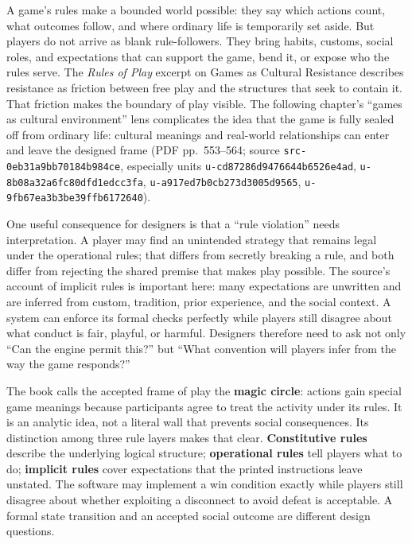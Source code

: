 \hypertarget{06-engine-ii-ch046-when-players-push-against-the-frame}{}

A game's rules make a bounded world possible: they say which actions count, what outcomes follow, and where ordinary life is temporarily set aside. But players do not arrive as blank rule-followers. They bring habits, customs, social roles, and expectations that can support the game, bend it, or expose who the rules serve. The \emph{Rules of Play} excerpt on Games as Cultural Resistance describes resistance as friction between free play and the structures that seek to contain it. That friction makes the boundary of play visible. The following chapter's ``games as cultural environment'' lens complicates the idea that the game is fully sealed off from ordinary life: cultural meanings and real-world relationships can enter and leave the designed frame (PDF pp.~553--564; source \texttt{src-0eb31a9bb70184b984ce}, especially units \texttt{u-cd87286d9476644b6526e4ad}, \texttt{u-8b08a32a6fc80dfd1edcc3fa}, \texttt{u-a917ed7b0cb273d3005d9565}, \texttt{u-9fb67ea3b3be39ffb6172640}).

One useful consequence for designers is that a ``rule violation'' needs interpretation. A player may find an unintended strategy that remains legal under the operational rules; that differs from secretly breaking a rule, and both differ from rejecting the shared premise that makes play possible. The source's account of implicit rules is important here: many expectations are unwritten and are inferred from custom, tradition, prior experience, and the social context. A system can enforce its formal checks perfectly while players still disagree about what conduct is fair, playful, or harmful. Designers therefore need to ask not only ``Can the engine permit this?'' but ``What convention will players infer from the way the game responds?''

The book calls the accepted frame of play the \textbf{magic circle}: actions gain special game meanings because participants agree to treat the activity under its rules. It is an analytic idea, not a literal wall that prevents social consequences. Its distinction among three rule layers makes that clear. \textbf{Constitutive rules} describe the underlying logical structure; \textbf{operational rules} tell players what to do; \textbf{implicit rules} cover expectations that the printed instructions leave unstated. The software may implement a win condition exactly while players still disagree about whether exploiting a disconnect to avoid defeat is acceptable. A formal state transition and an accepted social outcome are different design questions.

